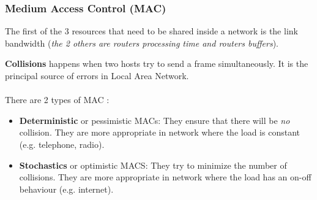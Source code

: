 \subsubsection{Medium Access Control (MAC)}
\label{medium_access_control}
The first of the 3 resources that need to be shared inside a network is the link bandwidth 
(\textit{the 2 others are routers processing time and routers buffers}).

\textbf{Collisions} happens when two hosts try to send a frame simultaneously.
It is the principal source of errors in Local Area Network.

\paragraph{ }
There are 2 types of MAC : 
\begin{itemize}
    \item \textbf{Deterministic} or pessimistic MACs: They ensure that there will be \emph{no} collision.
    They are more appropriate in network where the load is constant (e.g. telephone, radio).
\item \textbf{Stochastics} or optimistic MACS: They try to minimize the number of collisions.
    They are more appropriate in network where the load has an on-off behaviour (e.g. internet).
\end{itemize}

